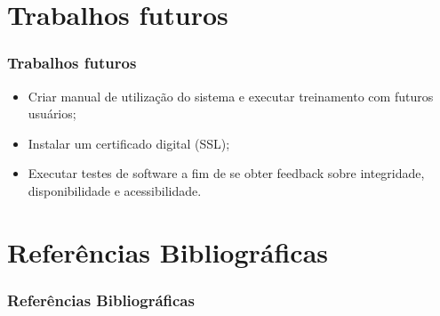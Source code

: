 \documentclass{beamer}
\begin{document}
\section{Trabalhos futuros}
\begin{frame}
    \frametitle{Trabalhos futuros}
    \begin{itemize}
        \item Criar manual de utilização do sistema e executar treinamento com futuros usuários;
        \item Instalar um certificado digital (SSL); %
        \item Executar testes de software a fim de se obter feedback sobre integridade, disponibilidade e acessibilidade. %
    \end{itemize}

    
\end{frame}

    

\section{Referências Bibliográficas}

\begin{frame}
    \frametitle{Referências Bibliográficas}
    \tiny{  
        
        
    }
  
\end{frame}
\end{document}
